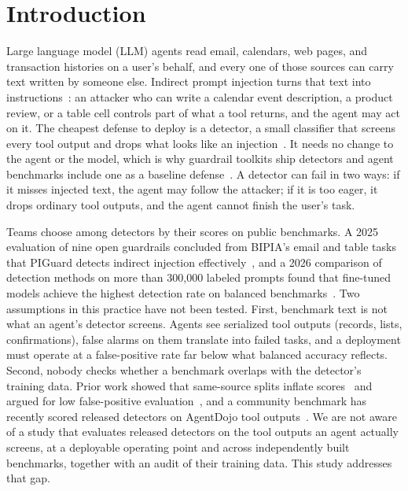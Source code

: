 \section{Introduction}
\label{sec:intro}

Large language model (LLM) agents read email, calendars, web pages, and transaction histories on a user's behalf, and every one of those sources can carry text written by someone else. Indirect prompt injection turns that text into instructions~\cite{greshake2023}: an attacker who can write a calendar event description, a product review, or a table cell controls part of what a tool returns, and the agent may act on it. The cheapest defense to deploy is a detector, a small classifier that screens every tool output and drops what looks like an injection~\cite{piguard,llamafirewall,promptshield}. It needs no change to the agent or the model, which is why guardrail toolkits ship detectors and agent benchmarks include one as a baseline defense~\cite{agentdojo}. A detector can fail in two ways: if it misses injected text, the agent may follow the attacker; if it is too eager, it drops ordinary tool outputs, and the agent cannot finish the user's task.

Teams choose among detectors by their scores on public benchmarks. A 2025 evaluation of nine open guardrails concluded from BIPIA's email and table tasks that PIGuard detects indirect injection effectively~\cite{mozillaguardrails}, and a 2026 comparison of detection methods on more than 300{,}000 labeled prompts found that fine-tuned models achieve the highest detection rate on balanced benchmarks~\cite{dzhaliuk2026}. Two assumptions in this practice have not been tested. First, benchmark text is not what an agent's detector screens. Agents see serialized tool outputs (records, lists, confirmations), false alarms on them translate into failed tasks, and a deployment must operate at a false-positive rate far below what balanced accuracy reflects. Second, nobody checks whether a benchmark overlaps with the detector's training data. Prior work showed that same-source splits inflate scores~\cite{benchmarkslie} and argued for low false-positive evaluation~\cite{promptshield,pidsbench}, and a community benchmark has recently scored released detectors on AgentDojo tool outputs~\cite{buriedinjections}. We are not aware of a study that evaluates released detectors on the tool outputs an agent actually screens, at a deployable operating point and across independently built benchmarks, together with an audit of their training data. This study addresses that gap.

